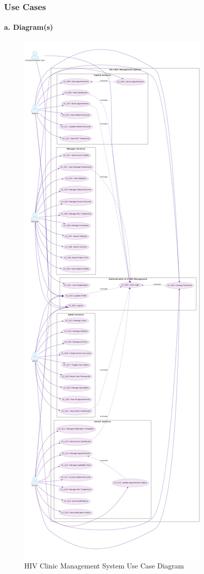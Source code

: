 \documentclass[12pt,a4paper]{article}
\begin{document}
\subsubsection{Use Cases}

\paragraph{a. Diagram(s)}

\begin{figure}
\centering
\includegraphics[width=\textwidth,height=0.7\textheight,keepaspectratio]{diagrams/use_case_diagram.png}
\caption{HIV Clinic Management System Use Case Diagram}
\label{fig:use-case-diagram}
\end{figure}
\end{document}
